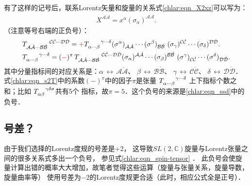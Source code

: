 有了这样的记号后，联系Lorentz矢量和旋量的关系式\eqref{chlar:eqn_X2xz}可以写为：
\begin{align}
    X^{{\mathcal{A}}\dot{\mathcal{A}}}=
    x^{\alpha} (\sigma_\alpha)^{{\mathcal{A}}\dot{\mathcal{A}}}.
\end{align}
（注意等号右端的正负号）：
\setlength{\mathindent}{0em}
\begin{subequations}\label{chlar:eqn_spin-tensor} 
    \begin{align}
        &T_{{\mathcal{A}}\dot{\mathcal{A}} \cdots {\mathcal{B}}\dot{\mathcal{B}}}^{\hphantom{B\dot{B} 
                \cdots B\dot{B}} {\mathcal{C}}\dot{\mathcal{C}}\cdots {\mathcal{D}}\dot{\mathcal{D}}}={\color{red}+}
        T_{\alpha \cdots \beta}^{\hphantom{\alpha \cdots \beta} \gamma\cdots \delta}
        (\sigma^\alpha)_{{\mathcal{A}}\dot{\mathcal{A}}} \cdots (\sigma^\beta)_{{\mathcal{B}}\dot{\mathcal{B}}} \ 
        (\sigma_\gamma)^{{\mathcal{C}}\dot{\mathcal{C}}} \cdots (\sigma_\delta)^{{\mathcal{D}}\dot{\mathcal{D}}} .
        \label{chlar:eqn_T2s} \\
        &T_{\alpha \cdots \beta}^{\hphantom{\alpha \cdots \beta} \gamma\cdots \delta} = ({\color{red}-})^{\pi}\, 
        T_{{\mathcal{A}}\dot{\mathcal{A}} \cdots {\mathcal{B}}\dot{\mathcal{B}}}^{\hphantom{B\dot{B} 
                \cdots B\dot{B}} {\mathcal{C}}\dot{\mathcal{C}}\cdots {\mathcal{D}}\dot{\mathcal{D}}}
        (\sigma_\alpha)^{{\mathcal{A}}\dot{\mathcal{A}}}\cdots(\sigma_\beta)^{{\mathcal{B}}\dot{\mathcal{B}}}\ 
        (\sigma^\gamma)_{{\mathcal{C}}\dot{\mathcal{C}}}\cdots(\sigma^\delta)_{{\mathcal{D}}\dot{\mathcal{D}}}.
        \label{chlar:eqn_s2T} 
    \end{align}
\end{subequations}\setlength{\mathindent}{2em}
其中分量指标间的对应关系是：$\alpha \,\leftrightarrow\, {\mathcal{A}}\dot{\mathcal{A}}$、
$\beta \,\leftrightarrow\, {\mathcal{B}}\dot{\mathcal{B}}$、
$\gamma \,\leftrightarrow\, {\mathcal{C}}\dot{\mathcal{C}}$、
$\delta \,\leftrightarrow\, {\mathcal{D}}\dot{\mathcal{D}}$．
式\eqref{chlar:eqn_s2T}中的系数$(-)^\pi$中的因子$\pi$是张量
$T_{\alpha \cdots \beta}^{\hphantom{\alpha \cdots \beta} \gamma\cdots \delta}$
上下指标个数之和；比如
$T_{\alpha \beta}^{\hphantom{\alpha \beta} \gamma \delta \sigma}$共有5个
指标，故$\pi=5$．这个负号的来源是\eqref{chlar:eqn_ssd}中的负号．




\subsection{号差？}
由于我们选择的Lorentz度规的号差是$+2$，
这导致$SL(2,\mathbb{C})$旋量与Lorentz张量之间的很多关系式多出一个{\kaishu 负号}，
参见式\eqref{chlar:eqn_spin-tensor} ．
此负号会使旋量计算出错的概率大大增加，故笔者觉得这些运算（旋量与张量关系，旋量导数，旋量曲率等）
使用号差为$-2$的Lorentz度规更合适（此时，相应公式全是正号\cite{penrose-Rindler1984}）．






